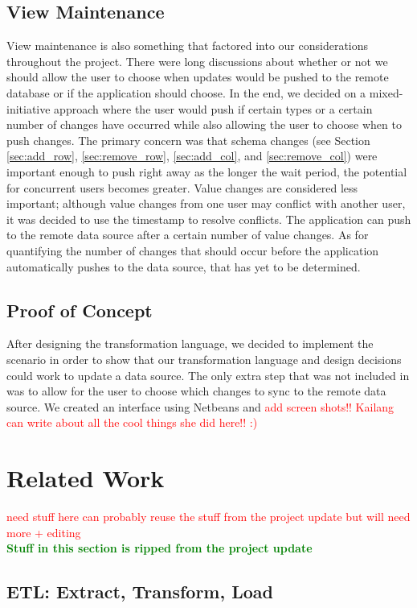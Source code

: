 \documentclass[12pt]{article}
\begin{document}
\subsection{View Maintenance}
View maintenance is also something that factored into our considerations throughout the project. There were long discussions about whether or not we should allow the user to choose when updates would be pushed to the remote database or if the application should choose. In the end, we decided on a mixed-initiative approach where the user would push if certain types or a certain number of changes have occurred while also allowing the user to choose when to push changes. The primary concern was that schema changes (see Section \ref{sec:add_row}, \ref{sec:remove_row}, \ref{sec:add_col}, and \ref{sec:remove_col}) were important enough to push right away as the longer the wait period, the potential for concurrent users becomes greater. Value changes are considered less important; although value changes from one user may conflict with another user, it was decided to use the timestamp to resolve conflicts. The application can push to the remote data source after a certain number of value changes. As for quantifying the number of changes that should occur before the application automatically pushes to the data source, that has yet to be determined.

\subsection{Proof of Concept}
After designing the transformation language, we decided to implement the scenario in order to show that our transformation language and design decisions could work to update a data source. The only extra step that was not included in \cite{arniThesis} was to allow for the user to choose which changes to sync to the remote data source. We created an interface using Netbeans and \textcolor{red}{add screen shots!! Kailang can write about all the cool things she did here!! :)}

\section{Related Work}
\textcolor{red}{need stuff here can probably reuse the stuff from the project update but will need more + editing} \\
\textbf{\textcolor{green}{Stuff in this section is ripped from the project update}}

\subsection{ETL: Extract, Transform, Load}
\end{document}
